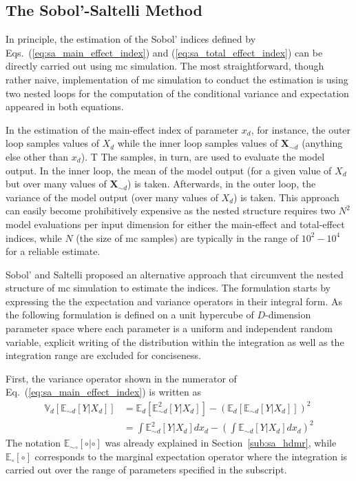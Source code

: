 \subsection{The Sobol'-Saltelli Method}\label{sub:sa_sobol_saltelli}

In principle, the estimation of the Sobol' indices defined by Eqs.~(\ref{eq:sa_main_effect_index}) and (\ref{eq:sa_total_effect_index}) can be directly carried out using \gls{mc} simulation.
The most straightforward, though rather naive, implementation of \gls{mc} simulation to conduct the estimation is using two nested loops for the computation of the conditional variance and expectation appeared in both equations.

In the estimation of the main-effect index of parameter $x_d$, for instance, the outer loop samples values of $X_d$ while the inner loop samples values of $\mathbf{X}_{\sim d}$ (anything else other than $x_d$). T
The samples, in turn, are used to evaluate the model output.
In the inner loop, the mean of the model output (for a given value of $X_d$ but over many values of $\mathbf{X}_{\sim d}$) is taken. 
Afterwards, in the outer loop, the variance of the model output (over many values of $X_d$) is taken.
This approach can easily become prohibitively expensive as the nested structure requires two $N^2$ model evaluations per input dimension for either the main-effect and total-effect indices, while $N$ (the size of \gls{mc} samples) are typically in the range of $10^2 - 10^4$ for a reliable estimate. 
   
Sobol' \cite{Sobol2001} and Saltelli \cite{Saltelli2002} proposed an alternative approach that circumvent the nested structure of \gls{mc} simulation to estimate the indices.
The formulation starts by expressing the the expectation and variance operators in their integral form.
As the following formulation is defined on a unit hypercube of $D$-dimension parameter space where each parameter is a uniform and independent random variable,
explicit writing of the distribution within the integration as well as the integration range are excluded for conciseness.

First, the variance operator shown in the numerator of Eq.~(\ref{eq:sa_main_effect_index}) is written as
\begin{equation}
  \begin{split}
    \mathbb{V}_{d}[\mathbb{E}_{\sim d}[Y|X_d]] & = \mathbb{E}_{d}[\mathbb{E}_{\sim d}^{2}[Y|X_d]] - \left(\mathbb{E}_{d}[\mathbb{E}_{\sim d}[Y|X_d]]\right)^2 \\ 
                                               & = \int \mathbb{E}_{\sim d}^{2}[Y|X_d] dx_d - \left(\int \mathbb{E}_{\sim d}[Y|X_d] dx_d\right)^2
  \end{split}
\label{eq:ss_variance_integral}
\end{equation}
The notation $\mathbb{E}_{\sim \circ}[\circ | \circ]$ was already explained in Section~\ref{sub:sa_hdmr}, 
while $\mathbb{E}_{\circ} [\circ]$ corresponds to the marginal expectation operator 
where the integration is carried out over the range of parameters specified in the subscript. 

